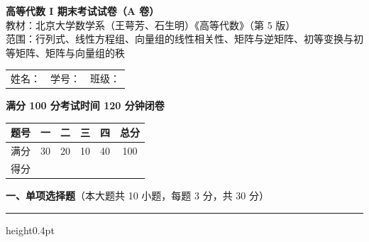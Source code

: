 \documentclass[12pt]{ctexart}
\newcommand{\bigsection}[2]{%
  \vspace{6pt}%
  {\noindent\bfseries\large #1}\hfill{\normalsize（本大题共 #2）}\par
  \vspace{2pt}\hrule height0.4pt\vspace{8pt}}
\newcommand{\blank}[1][2.6cm]{\underline{\hspace{#1}}}
\begin{document}
\begin{center}
  {\Large\bfseries 高等代数 I 期末考试试卷（A 卷）}\\[4pt]
  {\small 教材：北京大学数学系（王萼芳、石生明）《高等代数》（第 5 版）\\
  范围：行列式、线性方程组、向量组的线性相关性、矩阵与逆矩阵、初等变换与初等矩阵、矩阵与向量组的秩}\\[8pt]
\end{center}

\noindent
\begin{tabular}{@{}p{4.6cm}p{4.6cm}p{4.6cm}@{}}
姓名：\blank[2.8cm] & 学号：\blank[2.8cm] & 班级：\blank[2.8cm]
\end{tabular}

\vspace{6pt}
\noindent\textbf{满分 100 分\qquad 考试时间 120 分钟\qquad 闭卷}

\vspace{8pt}
\noindent
\renewcommand{\arraystretch}{1.4}
\begin{tabular}{|c|c|c|c|c|c|}
\hline
题号 & 一 & 二 & 三 & 四 & 总分 \\\hline
满分 & 30 & 20 & 10 & 40 & 100 \\\hline
得分 & & & & & \\\hline
\end{tabular}

\vspace{12pt}

\bigsection{一、单项选择题}{10 小题，每题 3 分，共 30 分}
\end{document}
